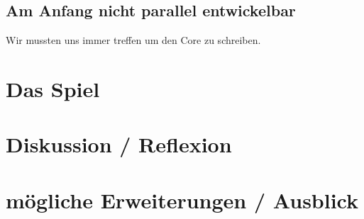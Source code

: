 \documentclass[12pt,a4paper]{scrartcl}
\begin{document}
\subsection{Am Anfang nicht parallel entwickelbar}
Wir mussten uns immer treffen um den Core zu schreiben.
\section{Das Spiel}
\newpage
\section{Diskussion / Reflexion}

\newpage
\section{mögliche Erweiterungen / Ausblick}

\clearpage
\listoffigures
\end{document}
